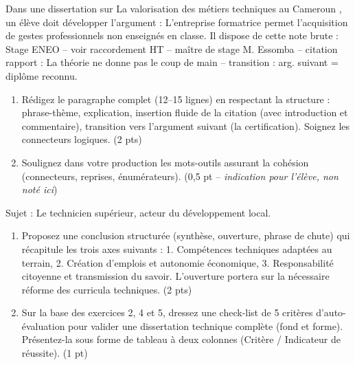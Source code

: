 \documentclass[11pt]{article}
\begin{document}
\begin{exercice}
Dans une dissertation sur \og La valorisation des métiers techniques au Cameroun \fg{}, un élève doit développer l'argument : \og L'entreprise formatrice permet l'acquisition de gestes professionnels non enseignés en classe.\fg{} Il dispose de cette note brute : \og Stage ENEO -- voir raccordement HT -- maître de stage M. Essomba -- citation rapport : \og La théorie ne donne pas le coup de main\fg{} -- transition : arg. suivant = diplôme reconnu.\fg{}
\begin{enumerate}
    \item Rédigez le paragraphe complet (12--15 lignes) en respectant la structure : phrase-thème, explication, insertion fluide de la citation (avec introduction et commentaire), transition vers l'argument suivant (la certification). Soignez les connecteurs logiques. (2 pts)
    \item Soulignez dans votre production les mots-outils assurant la cohésion (connecteurs, reprises, énumérateurs). (0,5 pt -- \textit{indication pour l'élève, non noté ici})
\end{enumerate}
\end{exercice}

\begin{exercice}
Sujet : \og Le technicien supérieur, acteur du développement local.\fg{}
\begin{enumerate}
    \item Proposez une conclusion structurée (synthèse, ouverture, phrase de chute) qui récapitule les trois axes suivants : 1. Compétences techniques adaptées au terrain, 2. Création d'emplois et autonomie économique, 3. Responsabilité citoyenne et transmission du savoir. L'ouverture portera sur la nécessaire réforme des curricula techniques. (2 pts)
    \item Sur la base des exercices 2, 4 et 5, dressez une check-list de 5 critères d'auto-évaluation pour valider une dissertation technique complète (fond et forme). Présentez-la sous forme de tableau à deux colonnes (Critère / Indicateur de réussite). (1 pt)
\end{enumerate}
\end{exercice}
\end{document}
